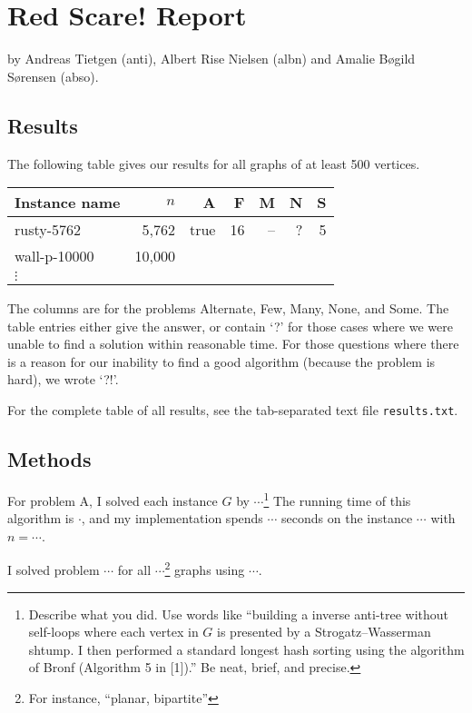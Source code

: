 \documentclass{tufte-handout}
\begin{document}
\section{Red Scare! Report}

by Andreas Tietgen (anti), Albert Rise Nielsen (albn) and Amalie Bøgild Sørensen (abso).

\subsection{Results}

The following table gives our results for all graphs of at least 500 vertices.

\medskip
\begin{tabular}{lrrrrrr}
  \toprule
  Instance name & $n$ & A & F & M & N & S \\
  \midrule
  rusty-5762 & 5,762 & true & 16 & -- & ? & 5 \\
  wall-p-10000 & 10,000 &\\	
  $\vdots$\\
  \bottomrule
\end{tabular}
\medskip

The columns are for the problems Alternate, Few, Many, None, and Some.
The table entries either give the answer, or contain `?' for those cases where we were unable to find a solution within reasonable time.
For those questions where there is a reason for our inability to find a good algorithm (because the problem is hard), we wrote `?!'.

For the complete table of all results, see the tab-separated text file {\tt results.txt}.

\subsection{Methods}

For problem A, I solved each instance $G$ by $\cdots$\footnote{Describe what you did.
  Use words like ``building a inverse anti-tree without self-loops where each vertex in $G$ is presented by a Strogatz--Wasserman shtump.
  I then performed a standard longest hash sorting using the algorithm of Bronf (Algorithm 5 in [1]).''
  Be neat, brief, and precise.}
The running time of this algorithm is $\cdot$, and my implementation spends $\cdots$ seconds on the instance $\cdots$ with  $n=\cdots$.

I solved problem $\cdots$ for all $\cdots$\footnote{For instance, “planar, bipartite”} graphs using $\cdots$.
\end{document}
